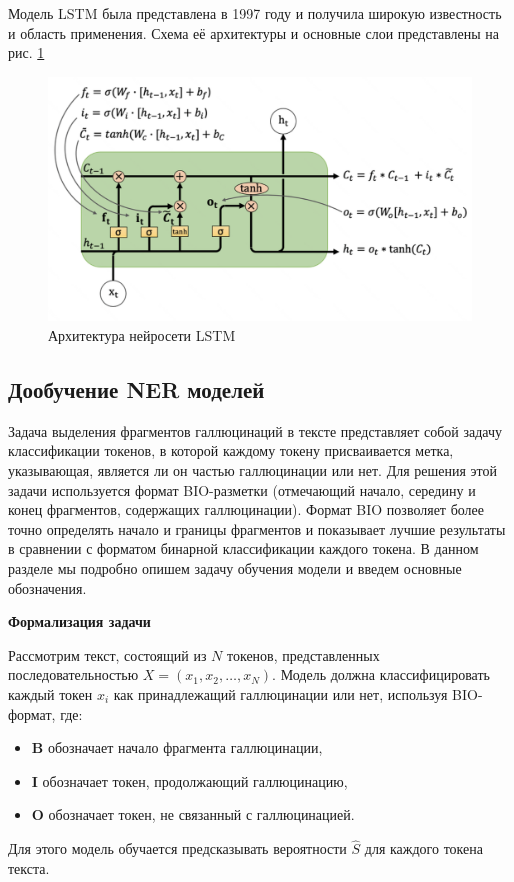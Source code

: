 \documentclass[12pt]{article}
\begin{document}
Модель LSTM была представлена в 1997 году \cite{lstm} и получила широкую известность и область применения. Схема её архитектуры и основные слои представлены на рис. \ref{fig:LSTM}

\begin{figure}[h]
    \centering
    \includegraphics[width=\textwidth]{images/LSTM.PNG}
    \caption{Архитектура нейросети LSTM}
    \label{fig:LSTM}
\end{figure}

\subsection{Дообучение NER моделей}
Задача выделения фрагментов галлюцинаций в тексте представляет собой задачу классификации токенов, в которой каждому токену присваивается метка, указывающая, является ли он частью галлюцинации или нет. Для решения этой задачи используется формат BIO-разметки (отмечающий начало, середину и конец фрагментов, содержащих галлюцинации). Формат BIO позволяет более точно определять начало и границы фрагментов и показывает лучшие результаты в сравнении с форматом бинарной классификации каждого токена. В данном разделе мы подробно опишем задачу обучения модели и введем основные обозначения.

\textbf{Формализация задачи}


Рассмотрим текст, состоящий из \( N \) токенов, представленных последовательностью \( X = (x_1, x_2, \ldots, x_N) \). Модель должна классифицировать каждый токен \( x_i \) как принадлежащий галлюцинации или нет, используя BIO-формат, где:
\begin{itemize}
\item \textbf{B} обозначает начало фрагмента галлюцинации,
\item \textbf{I} обозначает токен, продолжающий галлюцинацию,
\item \textbf{O} обозначает токен, не связанный с галлюцинацией.
\end{itemize}
Для этого модель обучается предсказывать вероятности \( \hat{S} \) для каждого токена текста.
\end{document}
